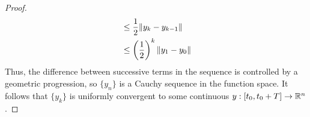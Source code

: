 \documentclass[../notes.tex]{subfiles}
\begin{document}
\begin{itemize}
\begin{proof}
\begin{align*}
            &\leq \frac{1}{2}\norm{y_k-y_{k-1}}\\
            &\leq \left( \frac{1}{2} \right)^k\norm{y_1-y_0}
        \end{align*}
        Thus, the difference between successive terms in the sequence is controlled by a geometric progression, so $\{y_n\}$ is a Cauchy sequence in the function space. It follows that $\{y_k\}$ is uniformly convergent to some continuous $y:[t_0,t_0+T]\to\mathbb{R}^n$.
    \end{proof}

\end{itemize}
\end{document}
